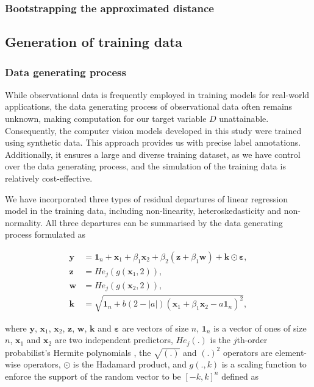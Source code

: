 \documentclass[]{interact}
\theoremstyle{plain}%
\theoremstyle{definition}
\theoremstyle{remark}
\begin{document}
\hypertarget{bootstrapping-the-approximated-distance}{%
\subsubsection{Bootstrapping the approximated
distance}\label{bootstrapping-the-approximated-distance}}

\hypertarget{generation-of-training-data}{%
\subsection{Generation of training
data}\label{generation-of-training-data}}

\hypertarget{data-generating-process}{%
\subsubsection{Data generating process}\label{data-generating-process}}

While observational data is frequently employed in training models for
real-world applications, the data generating process of observational
data often remains unknown, making computation for our target variable
\(D\) unattainable. Consequently, the computer vision models developed
in this study were trained using synthetic data. This approach provides
us with precise label annotations. Additionally, it ensures a large and
diverse training dataset, as we have control over the data generating
process, and the simulation of the training data is relatively
cost-effective.

We have incorporated three types of residual departures of linear
regression model in the training data, including non-linearity,
heteroskedasticity and non-normality. All three departures can be
summarised by the data generating process formulated as

\begin{align}
\label{eq:data-sim}
\boldsymbol{y} &= \boldsymbol{1}_n + \boldsymbol{x}_1 + \beta_1\boldsymbol{x}_2 + \beta_2(\boldsymbol{z} + \beta_1\boldsymbol{w}) + \boldsymbol{k} \odot \boldsymbol{\varepsilon}, \\
\boldsymbol{z} &= He_j(g(\boldsymbol{x}_1, 2)), \\
\boldsymbol{w} &= He_j(g(\boldsymbol{x}_2, 2)), \\
\boldsymbol{k} &= \sqrt{\boldsymbol{1}_n + b(2 - |a|)(\boldsymbol{x}_1 + \beta_1\boldsymbol{x}_2 - a\boldsymbol{1}_n)^2},
\end{align}

\noindent where \(\boldsymbol{y}\), \(\boldsymbol{x}_1\),
\(\boldsymbol{x}_2\), \(\boldsymbol{z}\), \(\boldsymbol{w}\),
\(\boldsymbol{k}\) and \(\boldsymbol{\varepsilon}\) are vectors of size
\(n\), \(\boldsymbol{1}_n\) is a vector of ones of size \(n\),
\(\boldsymbol{x}_1\) and \(\boldsymbol{x}_2\) are two independent
predictors, \(He_j(.)\) is the \(j\)th-order probabilist's Hermite
polynomials \citep{hermite1864nouveau}, the \(\sqrt{(.)}\) and \((.)^2\)
operators are element-wise operators, \(\odot\) is the Hadamard product,
and \(g(., k)\) is a scaling function to enforce the support of the
random vector to be \([-k, k]^n\) defined as
\end{document}
